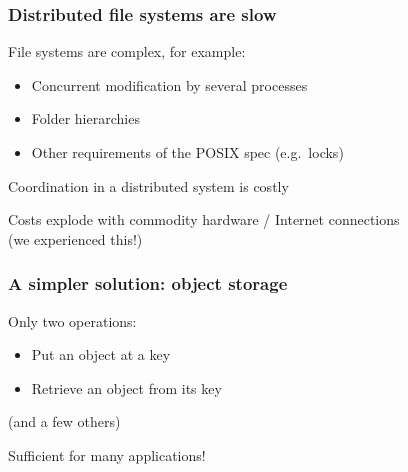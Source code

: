 \documentclass[aspectratio=169,xcolor={svgnames}]{beamer}
\begin{document}
\begin{frame}
	\frametitle{Distributed file systems are slow}
	File systems are complex, for example:
	\vspace{1em}
	\begin{itemize}
		\item Concurrent modification by several processes
			\vspace{1em}
		\item Folder hierarchies
			\vspace{1em}
		\item Other requirements of the POSIX spec (e.g.~locks)
	\end{itemize}
	\vspace{1em}
	Coordination in a distributed system is costly

	\vspace{1em}
	Costs explode with commodity hardware / Internet connections\\
	{\small (we experienced this!)}
\end{frame}

\begin{frame}
	\frametitle{A simpler solution: object storage}
	Only two operations:
	\vspace{1em}
	\begin{itemize}
		\item Put an object at a key
			\vspace{1em}
		\item Retrieve an object from its key
	\end{itemize}
	\vspace{1em}
	{\footnotesize (and a few others)}

	\vspace{1em}
	Sufficient for many applications!
\end{frame}
\end{document}
